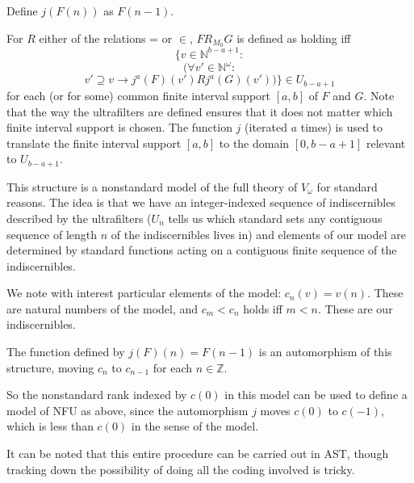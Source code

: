\documentclass{slides}
\begin{document}
\begin{slide}

Define $j(F(n))$ as $F(n-1)$.

For $R$ either of the relations = or $\in$, $F R_{M_0} G$ is defined as holding iff $$\{v \in \mathbb N^{b-a+1}:$$ $$(\forall v' \in \mathbb N^\omega:$$ $$  v' \supseteq v \rightarrow j^a(F)(v') R j^a(G)(v'))\} \in U_{b-a+1}$$ for each (or for some)  common finite interval support $[a,b]$ of $F$ and $G$.  Note that the way the ultrafilters are defined ensures that it does not matter which finite interval support is chosen.  The function $j$ (iterated $a$ times) is used to translate the finite interval support $[a,b]$ to the domain $[0,b-a+1]$ relevant to $U_{b-a+1}$.
\end{slide}

\begin{slide}

This structure is a nonstandard model of the full theory of $V_\omega$ for standard reasons.  The idea is that
we have an integer-indexed sequence of indiscernibles described by the ultrafilters ($U_n$ tells us which standard sets
any contiguous sequence of length $n$ of the indiscernibles lives in) and elements of our model are determined
by standard functions acting on a contiguous finite sequence of the indiscernibles.

\end{slide}

\begin{slide}

We note with interest particular elements of the model:  $c_n(v) = v(n)$.  These are natural numbers of the model,
and $c_m < c_n$ holds iff $m<n$.  These are our indiscernibles.

The function defined by $j(F)(n) = F(n-1)$ is an automorphism of this structure, moving $c_n$ to $c_{n-1}$ for each $n \in \mathbb Z$.

So the nonstandard rank indexed by $c(0)$ in this model can be used to define a model of NFU as above, since the automorphism $j$ moves $c(0)$ to $c(-1)$, which is less than $c(0)$ in the sense of the model.

It can be noted that this entire procedure can be carried out in AST, though tracking down the possibility of doing all the coding involved is tricky.

\end{slide}
\end{document}
